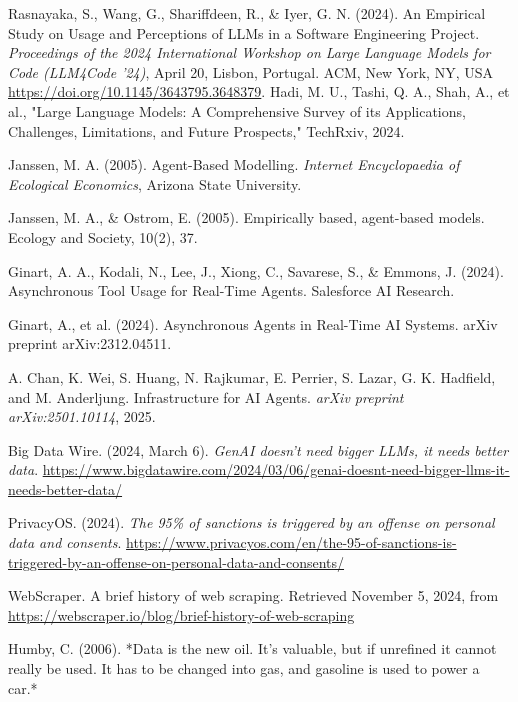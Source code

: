 \documentclass[english,master]{unibg}
\begin{document}
\begin{thebibliography}{1}
Rasnayaka, S., Wang, G., Shariffdeen, R., \& Iyer, G. N. (2024). An Empirical Study on Usage and Perceptions of LLMs in a Software Engineering Project. \textit{Proceedings of the 2024 International Workshop on Large Language Models for Code (LLM4Code ’24)}, April 20, Lisbon, Portugal. ACM, New York, NY, USA \url{https://doi.org/10.1145/3643795.3648379}.
 Hadi, M. U., Tashi, Q. A., Shah, A., et al., "Large Language Models: A Comprehensive Survey of its Applications, Challenges, Limitations, and Future Prospects," TechRxiv, 2024.

 Janssen, M. A. (2005). Agent-Based Modelling. \textit{Internet Encyclopaedia of Ecological Economics}, Arizona State University.

 Janssen, M. A., \& Ostrom, E. (2005). Empirically based, agent-based models. Ecology and Society, 10(2), 37.



 Ginart, A. A., Kodali, N., Lee, J., Xiong, C., Savarese, S., \& Emmons, J. (2024). Asynchronous Tool Usage for Real-Time Agents. Salesforce AI Research.



 Ginart, A., et al. (2024). Asynchronous Agents in Real-Time AI Systems. arXiv preprint arXiv:2312.04511.

A. Chan, K. Wei, S. Huang, N. Rajkumar, E. Perrier, S. Lazar, G. K. Hadfield, and M. Anderljung.
\newblock Infrastructure for AI Agents.
\newblock \emph{arXiv preprint arXiv:2501.10114}, 2025.

Big Data Wire. (2024, March 6). \textit{GenAI doesn’t need bigger LLMs, it needs better data}. \url{https://www.bigdatawire.com/2024/03/06/genai-doesnt-need-bigger-llms-it-needs-better-data/}

PrivacyOS. (2024). \textit{The 95\% of sanctions is triggered by an offense on personal data and consents}. \url{https://www.privacyos.com/en/the-95-of-sanctions-is-triggered-by-an-offense-on-personal-data-and-consents/}

WebScraper. A brief history of web scraping. Retrieved November 5, 2024, from \url{https://webscraper.io/blog/brief-history-of-web-scraping}

Humby, C. (2006). *Data is the new oil. It's valuable, but if unrefined it cannot really be used. It has to be changed into gas, and gasoline is used to power a car.*


\end{thebibliography}
\end{document}
